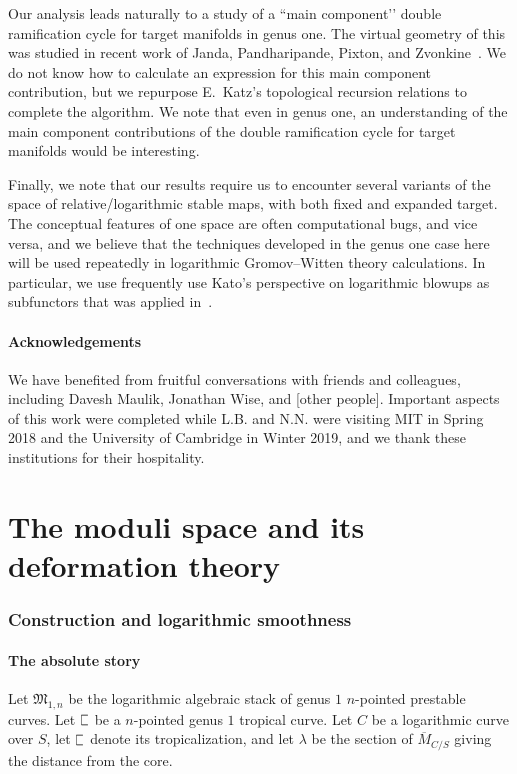 \documentclass[11pt]{amsart}
\newcommand{\plC}{\scalebox{0.8}[1.3]{$\sqsubset$}}
\theoremstyle{definition}
\theoremstyle{definition}
\begin{document}
Our analysis leads naturally to a study of a ``main component’’ double ramification cycle for target manifolds in genus one. The virtual geometry of this was studied in recent work of Janda, Pandharipande, Pixton, and Zvonkine~\cite{DRCBundle}. We do not know how to calculate an expression for this main component contribution, but we repurpose E.~Katz's topological recursion relations \cite{EKatz} to complete the algorithm. We note that even in genus one, an understanding of the main component contributions of the double ramification cycle for target manifolds would be interesting.

Finally, we note that our results require us to encounter several variants of the space of relative/logarithmic stable maps, with both fixed and expanded target. The conceptual features of one space are often computational bugs, and vice versa, and we believe that the techniques developed in the genus one case here will be used repeatedly in logarithmic Gromov--Witten theory calculations. In particular, we use frequently use Kato's perspective on logarithmic blowups as subfunctors that was applied in~\cite{RSPW,RSPW2}.

\subsection*{Acknowledgements} We have benefited from fruitful conversations with friends and colleagues, including Davesh Maulik, Jonathan Wise, and [other people]. Important  aspects of this work were completed while L.B. and N.N. were visiting MIT in Spring 2018 and the University of Cambridge in Winter 2019, and we thank these institutions for their hospitality.

\part{The moduli space and its deformation theory}

\section{Construction and logarithmic smoothness}

\subsection{The absolute story} Let $\mathfrak M_{1,n}$ be the logarithmic algebraic stack of genus $1$ $n$-pointed prestable curves. Let $\plC$ be a $n$-pointed genus $1$ tropical curve. Let $C$ be a logarithmic curve over $S$, let $\plC$ denote its tropicalization, and let $\lambda$ be the section of $\overline{M}_{C/S}$ giving the distance from the core. 
\end{document}
